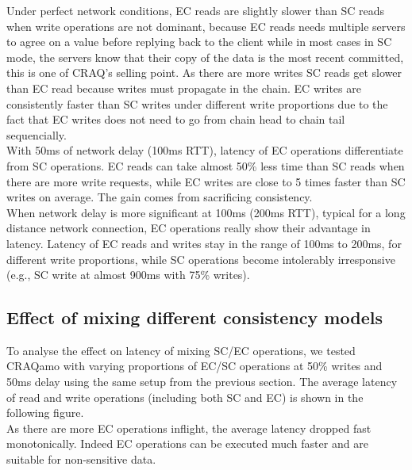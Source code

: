 
Under perfect network conditions, EC reads are slightly slower than SC reads when write operations are not dominant, because EC reads needs multiple servers to agree on a value before replying back to the client while in most cases in SC mode, the servers know that their copy of the data is the most recent committed, this is one of CRAQ's selling point. As there are more writes SC reads get slower than EC read because writes must propagate in the chain. EC writes are consistently faster than SC writes under different write proportions due to the fact that EC writes does not need to go from chain head to chain tail sequencially.\\

With 50ms of network delay (100ms RTT), latency of EC operations differentiate from SC operations. EC reads can take almost 50\% less time than SC reads when there are more write requests, while EC writes are close to 5 times faster than SC writes on average. The gain comes from sacrificing consistency.\\

When network delay is more significant at 100ms (200ms RTT), typical for a long distance network connection, EC operations really show their advantage in latency. Latency of EC reads and writes stay in the range of 100ms to 200ms, for different write proportions, while SC operations become intolerably irresponsive (e.g., SC write at almost 900ms with 75\% writes).


\subsection{Effect of mixing different consistency models}

To analyse the effect on latency of mixing SC/EC operations, we tested CRAQamo with varying proportions of EC/SC operations at 50\% writes and 50ms delay using the same setup from the previous section. The average latency of read and write operations (including both SC and EC) is shown in the following figure.\\



As there are more EC operations inflight, the average latency dropped fast monotonically. Indeed EC operations can be executed much faster and are suitable for non-sensitive data.\\


